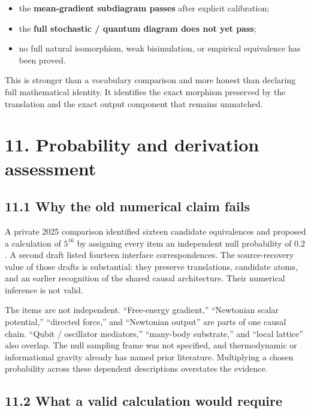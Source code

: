 \documentclass[
  american,
  11pt,
  letterpaper,
]{article}
\providecommand{\tightlist}{%
  \setlength{\itemsep}{0pt}\setlength{\parskip}{0pt}}
\begin{document}
\begin{itemize}
\tightlist
\item
  the \textbf{mean-gradient subdiagram passes} after explicit calibration;
\item
  the \textbf{full stochastic / quantum diagram does not yet pass};
\item
  no full natural isomorphism, weak bisimulation, or empirical equivalence has been proved.
\end{itemize}

This is stronger than a vocabulary comparison and more honest than declaring full mathematical identity. It identifies the exact morphism preserved by the translation and the exact output component that remains unmatched.

\section{11. Probability and derivation assessment}\label{probability-and-derivation-assessment}

\subsection{11.1 Why the old numerical claim fails}\label{why-the-old-numerical-claim-fails}

A private 2025 comparison identified sixteen candidate equivalences and proposed a calculation of \(5^{16}\) by assigning every item an independent null probability of \(0.2\). A second draft listed fourteen interface correspondences. The source-recovery value of those drafts is substantial: they preserve translations, candidate atoms, and an earlier recognition of the shared causal architecture. Their numerical inference is not valid.

The items are not independent. ``Free-energy gradient,'' ``Newtonian scalar potential,'' ``directed force,'' and ``Newtonian output'' are parts of one causal chain. ``Qubit / oscillator mediators,'' ``many-body substrate,'' and ``local lattice'' also overlap. The null sampling frame was not specified, and thermodynamic or informational gravity already has named prior literature. Multiplying a chosen probability across these dependent descriptions overstates the evidence.

\subsection{11.2 What a valid calculation would require}\label{what-a-valid-calculation-would-require}
\end{document}
